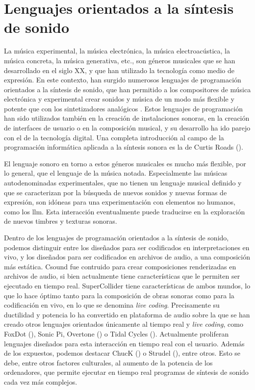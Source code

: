 \section{Lenguajes orientados a la síntesis de sonido}

La música experimental, la música electrónica, la música electroacústica, la música concreta, la música generativa, etc., son géneros musicales que se han desarrollado en el siglo XX, y que han utilizado la tecnología como medio de expresión. En este contexto, han surgido numerosos lenguajes de programación orientados a la síntesis de sonido, que han permitido a los compositores de música electrónica y experimental crear sonidos y música de un modo más flexible y potente que con los sintetizadores analógicos . Estos lenguajes de programación han sido utilizados también en la creación de instalaciones sonoras, en la creación de interfaces de usuario o en la composición musical, y su desarrollo ha ido parejo con el de la tecnología digital. Una completa introducción al campo de la programación informática aplicada a la síntesis sonora es la de Curtis Roads (\citeyear{roadsComputerMusicTutorial1996}).

El lenguaje sonoro en torno a estos géneros musicales es mucho más flexible, por lo general, que el lenguaje de la música notada. Especialmente las músicas autodenominadas experimentales, que no tienen un lenguaje musical definido y que se caracterizan por la búsqueda de nuevos sonidos y nuevas formas de expresión, son idóneas para una experimentación con elementos no humanos, como los \gls{llm}. Esta interacción eventualmente puede traducirse en la exploración de nuevos timbres y texturas sonoras.

Dentro de los lenguajes de programación orientados a la síntesis de sonido, podemos distinguir entre los diseñados para ser codificados en interpretaciones en vivo, y los diseñados para ser codificados en archivos de audio, a una composición más estática. {Csound} \citep{boulangerCsoundBookPerspectives2000} fue contruido para crear composiciones renderizadas en archivos de audio, si bien actualmente tiene características que le permiten ser ejecutado en tiempo real. {SuperCollider} \citep{wilsonSuperColliderBook2011a} tiene características de ambos mundos, lo que lo hace óptimo tanto para la composición de obras sonoras como para la codificación en vivo, en lo que se denomina \emph{live coding}. Precisamente su ductilidad y potencia lo ha convertido en plataforma de audio sobre la que se han creado otros lenguajes orientados únicamente al tiempo real y \emph{live coding}, como {FoxDot} (\citep{kirkbrideQirkyFoxDot2023}), {Sonic Pi}, {Overtone} (\citep{OvertoneCollaborativeProgrammable}) o {Tidal Cycles} (\citep{LiveCodeTidal}). Actualmente proliferan lenguajes diseñados para esta interacción en tiempo real con el usuario. Además de los expuestos, podemos destacar {ChucK} (\citep{teamChucKStronglyTimedMusic}) o {Strudel} (\citep{StrudelREPL}), entre otros. Esto se debe, entre otros factores culturales, al aumento de la potencia de los ordenadores, que permite ejecutar en tiempo real programas de síntesis de sonido cada vez más complejos.

